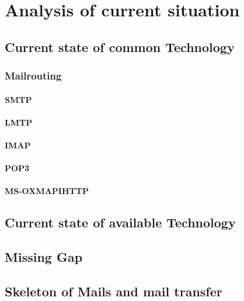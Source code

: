 \chapter{Analysis of current situation\label{analysis}}
\section{Current state of common Technology}
\subsection{Mailrouting}
\subsubsection{SMTP}
\subsubsection{LMTP}
\subsubsection{IMAP}
\subsubsection{POP3}
\subsubsection{MS-OXMAPIHTTP}
\section{Current state of available Technology}
\section{Missing Gap}
\section{Skeleton of Mails and mail transfer}


